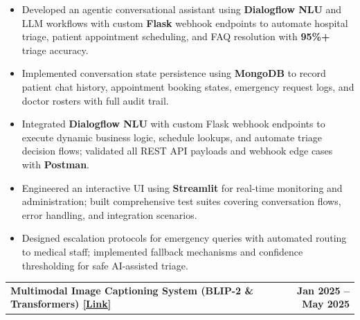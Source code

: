 \documentclass[10pt,a4paper]{article}
\makeatletter
\newcommand{\entry}[2]{%
    \noindent
    \begin{tabularx}{\linewidth}{@{}X r@{}}
        \textbf{#1} & \textbf{#2}
    \end{tabularx}
    \vspace{-2pt}
}
\makeatother
\begin{document}
\begin{itemize}

\item Developed an agentic conversational assistant using \textbf{Dialogflow NLU} and LLM workflows with custom \textbf{Flask} webhook endpoints to automate hospital triage, patient appointment scheduling, and FAQ resolution with \textbf{95\%+} triage accuracy.

\item Implemented conversation state persistence using \textbf{MongoDB} to record patient chat history, appointment booking states, emergency request logs, and doctor rosters with full audit trail.

\item Integrated \textbf{Dialogflow NLU} with custom Flask webhook endpoints to execute dynamic business logic, schedule lookups, and automate triage decision flows; validated all REST API payloads and webhook edge cases with \textbf{Postman}.

\item Engineered an interactive UI using \textbf{Streamlit} for real-time monitoring and administration; built comprehensive test suites covering conversation flows, error handling, and integration scenarios.

\item Designed escalation protocols for emergency queries with automated routing to medical staff; implemented fallback mechanisms and confidence thresholding for safe AI-assisted triage.

\end{itemize}

\vspace{1pt}

\entry
{Multimodal Image Captioning System (BLIP-2 \& Transformers)
\hspace{2pt}
\href{https://github.com/marideharshith21}
{\textcolor{linkblue}{[Link]}}}
{Jan 2025 -- May 2025}
\end{document}
